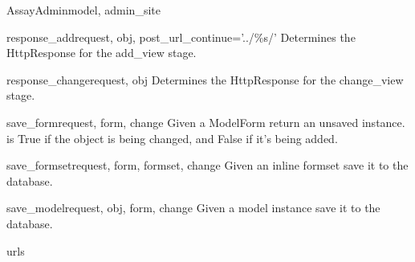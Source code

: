 \documentclass[letterpaper,10pt,english]{sphinxmanual}
\begin{document}
\begin{classdesc}{AssayAdmin}{model, admin\_site}
\hypertarget{data.admin.AssayAdmin.response_add}{}\begin{methoddesc}{response\_add}{request, obj, post\_url\_continue='../\%s/'}
Determines the HttpResponse for the add\_view stage.
\end{methoddesc}

\hypertarget{data.admin.AssayAdmin.response_change}{}\begin{methoddesc}{response\_change}{request, obj}
Determines the HttpResponse for the change\_view stage.
\end{methoddesc}

\hypertarget{data.admin.AssayAdmin.save_form}{}\begin{methoddesc}{save\_form}{request, form, change}
Given a ModelForm return an unsaved instance.  is True if
the object is being changed, and False if it's being added.
\end{methoddesc}

\hypertarget{data.admin.AssayAdmin.save_formset}{}\begin{methoddesc}{save\_formset}{request, form, formset, change}
Given an inline formset save it to the database.
\end{methoddesc}

\hypertarget{data.admin.AssayAdmin.save_model}{}\begin{methoddesc}{save\_model}{request, obj, form, change}
Given a model instance save it to the database.
\end{methoddesc}

\hypertarget{data.admin.AssayAdmin.urls}{}\begin{memberdesc}{urls}\end{memberdesc}
\end{classdesc}
\end{document}
